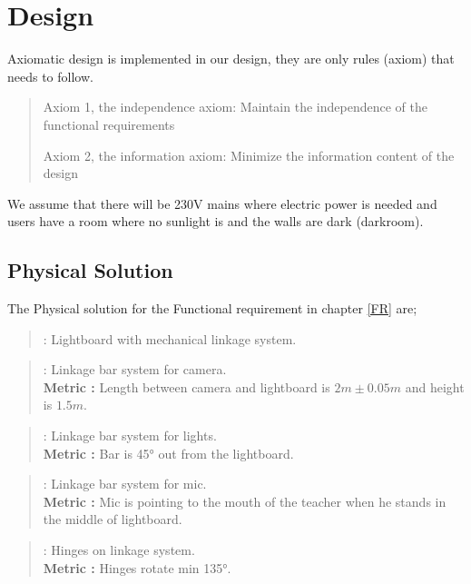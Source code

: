 \documentclass[a4paper]{jpconf}
\begin{document}
\section{Design}
Axiomatic design is implemented in our design, they are only rules (axiom) that needs to follow\cite{suh2001axiomatic}.  
\begin{quote}
	Axiom 1, the independence axiom:
	Maintain the independence of the functional requirements
	
	Axiom 2, the information axiom:
	Minimize the information content of the design
\end{quote}

We assume that there will be 230V mains where electric power is needed and users have a room where no sunlight is and the walls are dark (darkroom).     %

\subsection{Physical Solution}\label{PS}
The Physical solution for the Functional requirement in chapter \ref{FR} are;
\begin{quote} 
	\textbf{} : Lightboard with mechanical linkage system.
\end{quote}

\begin{quote} 
	\textbf{} : Linkage bar system for camera. \\ 
	\textbf{Metric :} Length between camera and lightboard is $2 m \pm 0.05 m$ and height is $1.5 m$.
\end{quote}

\begin{quote} 
	\textbf{} : Linkage bar system for lights.
	\\ \textbf{Metric :} Bar is 45° out from the lightboard.
\end{quote}

\begin{quote} 
	\textbf{} : Linkage bar system for mic.
	\\ \textbf{Metric :} Mic is pointing to the mouth of the teacher when he stands in the middle of lightboard.
\end{quote}

\begin{quote} 
	\textbf{} : Hinges on linkage system.
	\\ \textbf{Metric :} Hinges rotate min 135°.
\end{quote}
\end{document}
